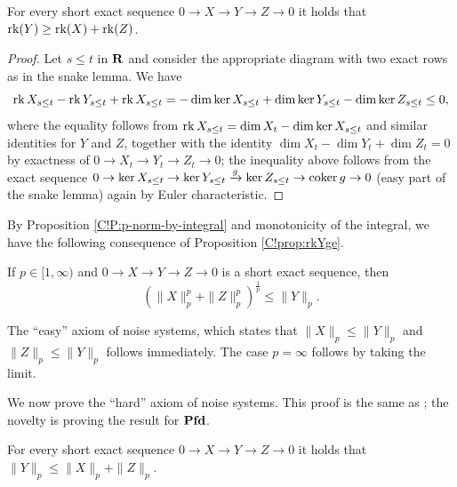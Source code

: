 \begin{proposition}
\label{C!prop:rkYge}
  For every short exact sequence $0\to X\to Y\to Z\to 0$ it holds that $\operatorname{rk} (Y) \ge \operatorname{rk} (X) + \operatorname{rk} (Z)$.
\end{proposition}

\begin{proof}
  Let $s\le t$ in $\mathbf{R}$ and consider the appropriate diagram with two exact rows as in the snake lemma. We have
  \[
    \operatorname{rk} X_{s\le t} - \operatorname{rk} Y_{s\le t} + \operatorname{rk} X_{s\le t} = - \dim \ker X_{s\le t} + \dim \ker Y_{s\le t} - \dim \ker Z_{s\le t} \le 0,
  \]
  where the equality follows from $\operatorname{rk} X_{s\le t} = \dim X_t - \dim \ker X_{s\le t}$ and similar identities for $Y$ and $Z$, together with the identity $\dim X_t - \dim Y_t + \dim Z_t =0$ by exactness of $0\to X_t\to Y_t\to Z_t\to 0$; the inequality above follows from the exact sequence $0 \to \ker X_{s\le t} \to \ker Y_{s\le t} \xrightarrow{g} \ker Z_{s\le t} \to \operatorname{coker} g \to 0$ (easy part of the snake lemma) again by Euler characteristic.
\end{proof}

By Proposition \ref{C!P:p-norm-by-integral} and monotonicity of the integral, we have the following consequence of Proposition \ref{C!prop:rkYge}.

\begin{corollary}
  If $p \in [1, \infty)$ and $0 \to X \to Y \to Z \to 0$ is a short exact sequence, then
  \[
    \left( \| X\|_p^p + \| Z\|_p^p \right)^\frac{1}{p} \le \| Y\|_p .
  \]
\end{corollary}

The ``easy'' axiom of noise systems, which states that $\| X\|_p \leq \| Y\|_p$ and $\| Z\|_p \leq \| Y\|_p$ follows immediately. The case $p=\infty$ follows by taking the limit. 

We now prove the ``hard'' axiom of noise systems. This proof is the same as \cite[Lemma 4.15]{AGRS2025}; the novelty is proving the result for $\operatorname{\mathbf{Pfd}}$.

\begin{proposition}
  For every short exact sequence $0\to X\to Y\to Z\to 0$ it holds that $\| Y \|_p \leq \| X \|_p + \| Z \|_p$.
\end{proposition}

